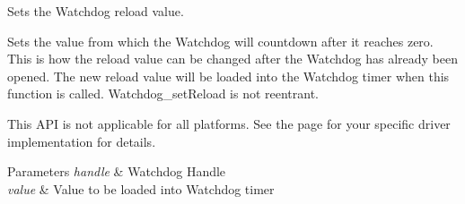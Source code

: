 Sets the Watchdog reload value. 

Sets the value from which the Watchdog will countdown after it reaches zero. This is how the reload value can be changed after the Watchdog has already been opened. The new reload value will be loaded into the Watchdog timer when this function is called. Watchdog\-\_\-set\-Reload is not reentrant.

This A\-P\-I is not applicable for all platforms. See the page for your specific driver implementation for details.


\begin{DoxyParams}{Parameters}
{\em handle} & Watchdog Handle \\
\hline
{\em value} & Value to be loaded into Watchdog timer \\
\hline
\end{DoxyParams}
